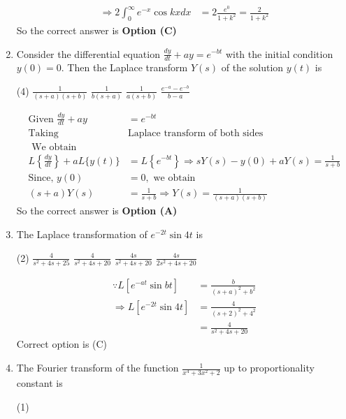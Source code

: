 \begin{enumerate}
\begin{answer}
$$\begin{aligned}
\Rightarrow 2 \int_{0}^{\infty} e^{-x} \cos k x d x&=2 \frac{e^{0}}{1+k^{2}}=\frac{2}{1+k^{2}}
\end{aligned}
$$
So the correct answer is \textbf{Option (C)}
\end{answer}
\item Consider the differential equation $\frac{d y}{d t}+a y=e^{-b t}$ with the initial condition $y(0)=0$. Then the Laplace transform $Y(s)$ of the solution $y(t)$ is
\begin{tasks}(4)
	\task[\textbf{A.}] $\frac{1}{(s+a)(s+b)}$
	\task[\textbf{B.}] $\frac{1}{b(s+a)}$
	\task[\textbf{C.}] $\frac{1}{a(s+b)}$
	\task[\textbf{D.}] $\frac{e^{-a}-e^{-b}}{b-a}$
\end{tasks}
\begin{answer}
	$$
	\begin{aligned}
	\text{Given }\frac{d y}{d t}+a y&=e^{-b t}\\
	\text{Taking }&\text{Laplace transform of both sides}\\
	\text{	We obtain}\\
	L\left\{\frac{d y}{d t}\right\}+a L\{y(t)\}&=L\left\{e^{-b t}\right\} \Rightarrow s Y(s)-y(0)+a Y(s)=\frac{1}{s+b}\\
	\text{Since, }	y(0)&=0,\text{ we obtain}\\
	(s+a) Y(s)&=\frac{1}{s+b} \Rightarrow Y(s)=\frac{1}{(s+a)(s+b)}
	\end{aligned}
	$$
	So the correct answer is \textbf{Option (A)}
\end{answer}
\item The Laplace transformation of $e^{-2 t} \sin 4 t$ is
\begin{tasks}(2)
	\task[\textbf{a.}]$\frac{4}{s^{2}+4 s+25}$
	\task[\textbf{b.}]$\frac{4}{s^{2}+4 s+20}$
	\task[\textbf{c.}]$\frac{4 s}{s^{2}+4 s+20}$
	\task[\textbf{d.}] $\frac{4 s}{2 s^{2}+4 s+20}$
\end{tasks}
\begin{answer}
	$$\begin{aligned}
	\because L\left[e^{-a t} \sin b t\right]&=\frac{b}{(s+a)^{2}+b^{2}}\\
	\Rightarrow L\left[e^{-2 t} \sin 4 t\right]&=\frac{4}{(s+2)^{2}+4^{2}}\\&=\frac{4}{s^{2}+4 s+20}
	\end{aligned}$$
	Correct option is (C)
\end{answer}
\item The Fourier transform of the function $\frac{1}{x^{4}+3 x^{2}+2}$ up to proportionality constant is
\begin{tasks}(1)

\end{tasks}
\end{enumerate}
